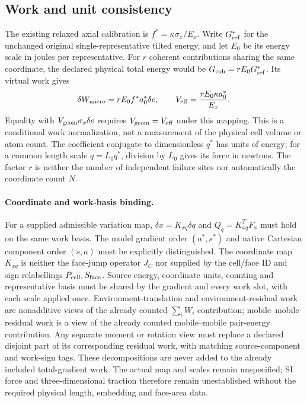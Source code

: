 \documentclass[11pt]{article}
\begin{document}
\subsection{Work and unit consistency}
The existing relaxed axial calibration is $f^*=\kappa\sigma_x/E_x$.
Write $G_{\rm ref}^*$ for the unchanged original single-representative tilted
energy, and let $E_0$ be its energy scale in joules per representative.
For $r$ coherent contributions sharing the same coordinate, the declared
physical total energy would be $G_{\rm coh}=rE_0G_{\rm ref}^*$.
Its virtual work gives
\begin{equation}
 \delta W_{\rm micro}=rE_0f^*a_0^*\delta e,\qquad
 V_{\rm eff}=\frac{rE_0\kappa a_0^*}{E_x}.
\end{equation}
Equality with $V_{\rm geom}\sigma_x\delta e$ requires
$V_{\rm geom}=V_{\rm eff}$ under this mapping. This is a conditional work
normalization, not a measurement of the physical cell volume or atom count.
The coefficient conjugate to dimensionless $q^*$ has units of energy;
for a common length scale $q=L_0q^*$, division by $L_0$ gives its force in newtons.
The factor $r$ is neither the number of independent failure sites nor
automatically the coordinate count $N$.

\paragraph{Coordinate and work-basis binding.}
For a supplied admissible variation map, $\delta x=K_{xq}\delta q$ and
$Q_q=K_{xq}^{T}F_x$ must hold on the same work basis.
The model gradient order $(a^*,s^*)$ and native Cartesian component order
$(s,a)$ must be explicitly distinguished. The coordinate map $K_{xq}$ is
neither the face-jump operator $J_C$ nor supplied by the cell/face ID and
sign relabellings $P_{\rm cell},S_{\rm face}$.
Source energy, coordinate units, counting and representative basis must be
shared by the gradient and every work slot, with each scale applied once.
Environment-translation and environment-residual work are nonadditive views
of the already counted $\sum_i W_i$ contribution; mobile--mobile residual work
is a view of the already counted mobile--mobile pair-energy contribution.
Any separate moment or rotation view must replace a declared disjoint part
of its corresponding residual work, with matching source-component and work-sign tags.
These decompositions are never added to the already included total-gradient work.
The actual map and scales remain unspecified; SI force and three-dimensional
traction therefore remain unestablished without the required physical
length, embedding and face-area data.
\end{document}
